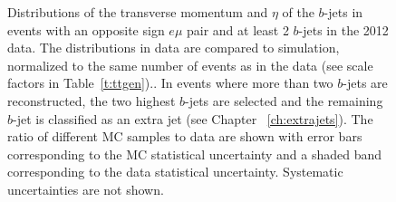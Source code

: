 \begin{figure}
\centering
{}

\caption{Distributions of the transverse momentum and $\eta$ of the $b$-jets in events with an opposite sign $e\mu$ pair  and at least 2 $b$-jets in the 2012 data. The distributions in data are compared to simulation, normalized to the same number of events as in the data  (see scale factors in Table~\ref{t:ttgen}).. In events where more than two $b$-jets are reconstructed, the two highest \pt $b$-jets are selected and the remaining $b$-jet is classified as an extra jet (see Chapter ~\ref{ch:extrajets}). The ratio of different MC samples to data are shown with error bars corresponding to the MC statistical uncertainty and a shaded band corresponding to the data statistical uncertainty. Systematic uncertainties are not shown.}
\label{fig:bjet}
\end{figure}

